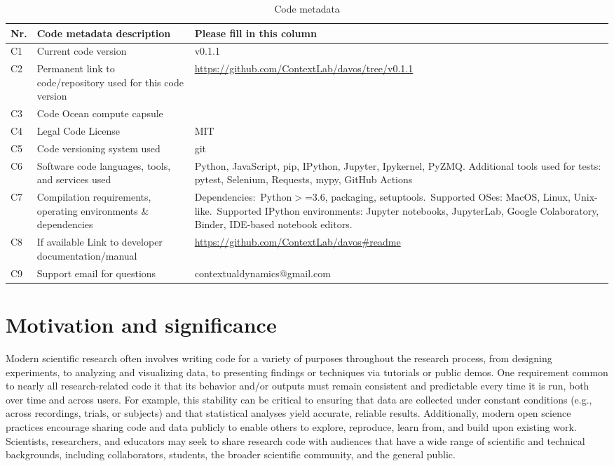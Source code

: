 \documentclass[preprint,12pt, a4paper]{elsarticle}
\begin{document}
\begin{table}[H]
\begin{tabular}{|l|p{6.5cm}|p{6.5cm}|}
\hline
\textbf{Nr.} & \textbf{Code metadata description} & \textbf{Please fill in this column} \\
\hline
C1 & Current code version &  v0.1.1 \\
\hline
C2 & Permanent link to code/repository used for this code version & \url{https://github.com/ContextLab/davos/tree/v0.1.1} \\
\hline
C3 & Code Ocean compute capsule & \\
\hline
C4 & Legal Code License & MIT \\
\hline
C5 & Code versioning system used & git \\
\hline
C6 & Software code languages, tools, and services used & Python, JavaScript, pip, IPython, Jupyter, Ipykernel, PyZMQ. Additional tools used for tests: pytest, Selenium, Requests, mypy, GitHub Actions \\
\hline
C7 & Compilation requirements, operating environments \& dependencies & Dependencies:~Python$>$=3.6, packaging, setuptools.~Supported OSes: MacOS, Linux, Unix-like.~Supported IPython environments: Jupyter notebooks, JupyterLab, Google Colaboratory, Binder, IDE-based notebook editors. \\
\hline
C8 & If available Link to developer documentation/manual & \url{https://github.com/ContextLab/davos\#readme} \\
\hline
C9 & Support email for questions & contextualdynamics@gmail.com \\
\hline
\end{tabular}
\caption{Code metadata}
\label{}
\end{table}

\linenumbers


\section{Motivation and significance}
Modern scientific research often involves writing code for a variety of purposes throughout the research process, from designing experiments, to analyzing and visualizing data, to presenting findings or techniques via tutorials or public demos. One requirement common to nearly all research-related code it that its behavior and/or outputs must remain consistent and predictable every time it is run, both over time and across users. For example, this stability can be critical to ensuring that data are collected under constant conditions (e.g., across recordings, trials, or subjects) and that statistical analyses yield accurate, reliable results. Additionally, modern open science practices encourage sharing code and data publicly to enable others to explore, reproduce, learn from, and build upon existing work. Scientists, researchers, and educators may seek to share research code with audiences that have a wide range of scientific and technical backgrounds, including collaborators, students, the broader scientific community, and the general public.
\end{document}
